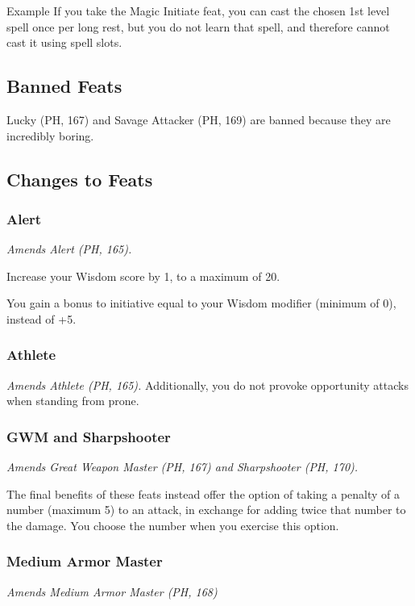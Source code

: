 \documentclass[letterpaper,twocolumn,openany,nodeprecatedcode]{dndbook}
\begin{document}
\begin{DndComment}{Example}
If you take the Magic Initiate feat, you can cast the chosen 1st level spell once per long rest, but you do not learn that spell, and therefore cannot cast it using spell slots.
\end{DndComment}

\label{balance-feats-banned}
\subsection{Banned Feats}
Lucky (PH, 167) and Savage Attacker (PH, 169) are banned because they are incredibly boring.

\subsection{Changes to Feats}

\subsubsection{Alert}
\textit{Amends Alert (PH, 165).}

Increase your Wisdom score by 1, to a maximum of 20. 

You gain a bonus to initiative equal to your Wisdom modifier (minimum of 0), instead of +5.

\subsubsection{Athlete}
\textit{Amends Athlete (PH, 165).}
Additionally, you do not provoke opportunity attacks when standing from prone.

\subsubsection{GWM and Sharpshooter}
\textit{Amends Great Weapon Master (PH, 167) and Sharpshooter (PH, 170).}

The final benefits of these feats instead offer the option of taking a penalty of a number (maximum 5) to an attack, in exchange for adding twice that number to the damage. You choose the number when you exercise this option. 

\subsubsection{Medium Armor Master}
\textit{Amends Medium Armor Master (PH, 168)}
\end{document}
